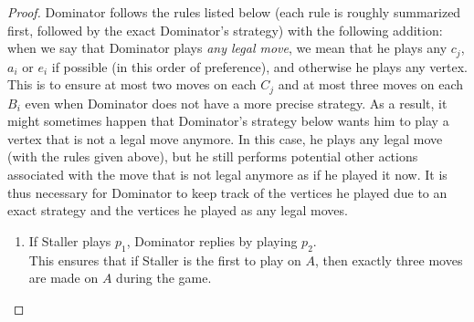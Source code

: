 \documentclass[10pt,a4paper]{amsart}
\begin{document}
\begin{proof}
	Dominator follows the rules listed below (each rule is roughly summarized first, followed by the exact Dominator's strategy) with the following addition: when we say that Dominator plays \emph{any legal move}, we mean that he plays any $c_j$, $a_i$ or $e_i$ if possible (in this order of preference), and otherwise he plays any vertex. This is to ensure at most two moves on each $C_j$ and at most three moves on each $B_i$ even when Dominator does not have a more precise strategy. As a result, it might sometimes happen that Dominator's strategy below wants him to play a vertex that is not a legal move anymore. In this case, he plays any legal move (with the rules given above), but he still performs potential other actions associated with the move that is not legal anymore as if he played it now. It is thus necessary for Dominator to keep track of the vertices he played due to an exact strategy and the vertices he played as any legal moves. 
	\begin{enumerate}[(1)]
		\item If Staller plays $p_1$, Dominator replies by playing $p_2$.\\
		This ensures that if Staller is the first to play on $A$, then exactly three moves are made on $A$ during the game.
		

\end{enumerate}
\end{proof}
\end{document}
